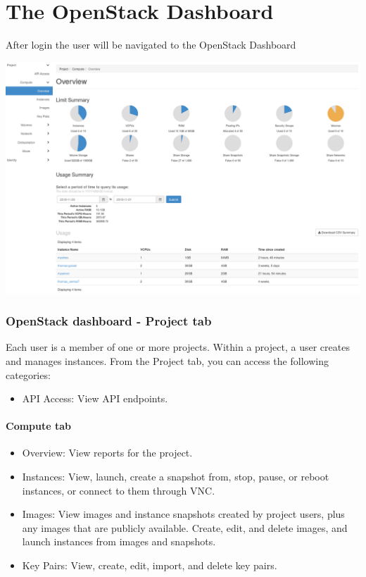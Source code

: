 \chapter{The OpenStack Dashboard}

After login the user will be navigated to the \gls{OpenStack Dashboard}

\begin{center}
\includegraphics[scale=0.3]{img/tab-compute-overview.png}
\end{center}

\subsection{OpenStack dashboard - Project
tab}\label{openstack-dashboard---project-tab}

Each user is a member of one or more projects. Within a project, a user
creates and manages instances. From the Project tab, you can access the
following categories:

\begin{itemize}
\item
  API Access: View API endpoints.
\end{itemize}

\subsubsection{\texorpdfstring{Compute
tab}{Compute tab}}\label{compute-tab}

\begin{itemize}
\item
  Overview: View reports for the project.
\item
  Instances: View, launch, create a snapshot from, stop, pause, or
  reboot instances, or connect to them through VNC.
\item
  Images: View images and instance snapshots created by project users,
  plus any images that are publicly available. Create, edit, and delete
  images, and launch instances from images and snapshots.
\item
  Key Pairs: View, create, edit, import, and delete key pairs.
\end{itemize}

